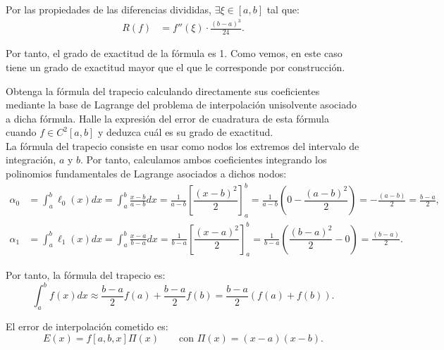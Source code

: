 \begin{ejercicio}
\begin{enumerate}
        Por las propiedades de las diferencias divididas, $\exists \xi \in [a, b]$ tal que:
        \begin{align*}
            R(f) &= f''(\xi)\cdot \frac{(b - a)^3}{24}.
        \end{align*}

        Por tanto, el grado de exactitud de la fórmula es 1. Como vemos, en este caso tiene un grado de exactitud mayor que el que le corresponde por construcción.
    \end{enumerate}
\end{ejercicio}

\begin{ejercicio}\label{ej:2.1.12}
    Obtenga la fórmula del trapecio calculando directamente sus coeficientes mediante la base de Lagrange del problema de interpolación unisolvente asociado a dicha fórmula. Halle la expresión del error de cuadratura de esta fórmula cuando $f \in C^2[a, b]$ y deduzca cuál es su grado de exactitud.\\

    La fórmula del trapecio consiste en usar como nodos los extremos del intervalo de integración, $a$ y $b$. Por tanto, calculamos ambos coeficientes integrando los polinomios fundamentales de Lagrange asociados a dichos nodos:
    \begin{align*}
        \alpha_0 &= \int_{a}^{b} \ell_0(x) dx = \int_{a}^{b} \frac{x - b}{a - b} dx = \frac{1}{a - b} \left[\dfrac{(x-b)^2}{2}\right]_{a}^{b} = \frac{1}{a - b} \left(0 - \dfrac{(a-b)^2}{2}\right) = -\frac{(a-b)}{2} = \frac{b-a}{2},\\
        \alpha_1 &= \int_{a}^{b} \ell_1(x) dx = \int_{a}^{b} \frac{x - a}{b - a} dx = \frac{1}{b - a} \left[\dfrac{(x-a)^2}{2}\right]_{a}^{b} = \frac{1}{b - a} \left(\dfrac{(b-a)^2}{2} - 0\right) = \frac{(b-a)}{2}.
    \end{align*}

    Por tanto, la fórmula del trapecio es:
    \begin{equation*}
        \int_{a}^{b} f(x) dx \approx \frac{b-a}{2} f(a) + \frac{b-a}{2} f(b) = \frac{b-a}{2} (f(a) + f(b)).
    \end{equation*}

    El error de interpolación cometido es:
    \begin{equation*}
        E(x) = f[a,b,x]\Pi(x)\qquad \text{con } \Pi(x) = (x - a)(x - b).
    \end{equation*}


\end{ejercicio}
